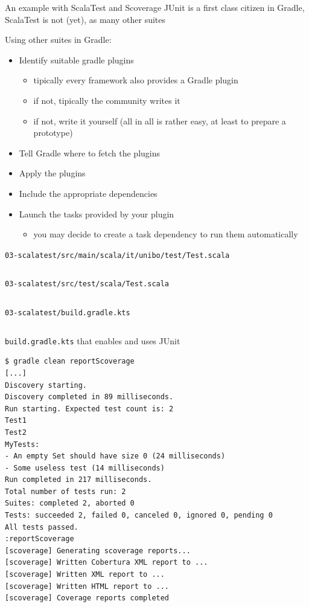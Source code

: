 \documentclass[presentation]{beamer}
\newcommand{\codefile}[3]{
	\begin{block}{\texttt{#1}}
		\inputminted[fontsize=#2,linenos=true,breaklines=true]{#3}{workspace/#1}
	\end{block}
}
\newcommand{\groovy}[2]{\codefile{#1}{#2}{groovy}}
\newcommand{\scala}[2]{\codefile{#1}{#2}{scala}}
\begin{document}
\begin{frame}{An example with ScalaTest and Scoverage}
	JUnit is a first class citizen in Gradle, ScalaTest is not (yet), as many other suites
	\begin{block}{Using other suites in Gradle:}
		\begin{itemize}
			\item Identify suitable gradle plugins
			\begin{itemize}
				\item tipically every framework also provides a Gradle plugin
				\item if not, tipically the community writes it
				\item if not, write it yourself (all in all is rather easy, at least to prepare a prototype)
			\end{itemize}
			\item Tell Gradle where to fetch the plugins
			\item Apply the plugins
			\item Include the appropriate dependencies
			\item Launch the tasks provided by your plugin
			\begin{itemize}
				\item you may decide to create a task dependency to run them automatically
			\end{itemize}
		\end{itemize}
	\end{block}
	\scala{03-scalatest/src/main/scala/it/unibo/test/Test.scala}{\normalsize}
	\scala{03-scalatest/src/test/scala/Test.scala}{\scriptsize}
	\groovy{03-scalatest/build.gradle.kts}{\tiny}
		\begin{block}{\texttt{build.gradle.kts} that enables and uses JUnit}
		\begin{verbatim}
$ gradle clean reportScoverage
[...]
Discovery starting.
Discovery completed in 89 milliseconds.
Run starting. Expected test count is: 2
Test1
Test2
MyTests:
- An empty Set should have size 0 (24 milliseconds)
- Some useless test (14 milliseconds)
Run completed in 217 milliseconds.
Total number of tests run: 2
Suites: completed 2, aborted 0
Tests: succeeded 2, failed 0, canceled 0, ignored 0, pending 0
All tests passed.
:reportScoverage
[scoverage] Generating scoverage reports...
[scoverage] Written Cobertura XML report to ...
[scoverage] Written XML report to ...
[scoverage] Written HTML report to ...
[scoverage] Coverage reports completed


\end{verbatim}
\end{block}
\end{frame}
\end{document}
